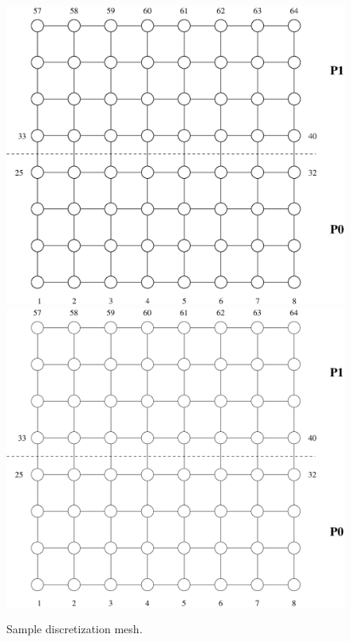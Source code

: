 \begin{figure}[h] 
\begin{center}
\ifcase\pdfoutput
\includegraphics[scale=0.45]{figures/try8x8.eps}
\or
\includegraphics[scale=0.45]{figures/try8x8}
\fi
\end{center}
\caption{Sample discretization mesh.\label{fig:try8x8}}
\end{figure}

